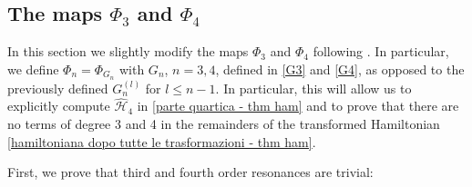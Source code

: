 \documentclass[a4paper,10pt,reqno]{article}
\theoremstyle{definition}
\theoremstyle{plain}
\theoremstyle{plain}
\theoremstyle{definition}
\theoremstyle{plain}
\theoremstyle{plain}
\theoremstyle{plain}
\theoremstyle{definition}
\theoremstyle{definition}
\def \H{\mathcal{H}}
\begin{document}
\subsection{The maps \texorpdfstring{$\Phi_3$ and $\Phi_4$}.} \label{subsection: cases 3 and 4}

In this section we slightly modify the maps $\Phi_3$ and $\Phi_4$ following . 
In particular, we define $\Phi_n = \Phi_{G_n}$ with $G_n$, $n=3,4$, defined in \eqref{G3} and \eqref{G4}, as opposed to the previously defined $G_n^{(l)}$ for $l \leq n-1$. 
In particular, this will allow us to explicitly compute $\widehat{\H}_4$ in \eqref{parte quartica - thm ham} and to prove that there are no terms of degree 3 and 4 in the remainders of the transformed Hamiltonian \eqref{hamiltoniana dopo tutte le trasformazioni - thm ham}. 

First, we prove that third and fourth order resonances are trivial:



\end{document}

